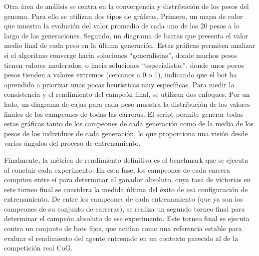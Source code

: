 Otra área de análisis se centra en la convergencia y distribución de los pesos del genoma. Para ello se utilizan dos tipos de gráficas. Primero, un mapa de calor que muestra la evolución del valor promedio de cada uno de los 20 pesos a lo largo de las generaciones. Segundo, un diagrama de barras que presenta el valor medio final de cada peso en la última generación. Estas gráficas permiten analizar si el algoritmo converge hacia soluciones ``generalistas'', donde muchos pesos tienen valores moderados, o hacia soluciones ``especialistas'', donde unos pocos pesos tienden a valores extremos (cercanos a 0 o 1), indicando que el bot ha aprendido a priorizar unas pocas heurísticas muy específicas. Para medir la consistencia y el rendimiento del campeón final, se utilizan dos enfoques. Por un lado, un diagrama de cajas para cada peso muestra la distribución de los valores finales de los campeones de todas las carreras. El script permite generar todas estas gráficas tanto de los campeones de cada generación como de la media de los pesos de los individuos de cada generación, lo que proporciona una visión desde varios ángulos del proceso de entrenamiento.

Finalmente, la métrica de rendimiento definitiva es el benchmark que se ejecuta al concluir cada experimento. En esta fase, los campeones de cada carrera compiten entre sí para determinar al ganador absoluto, cuya tasa de victorias en este torneo final se considera la medida última del éxito de esa configuración de entrenamiento. De entre los campeones de cada entrenamiento (que ya son los campeones de su conjunto de carreras), se realiza un segundo torneo final para determinar el campeón absoluto de ese experimento. Este torneo final se ejecuta contra un conjunto de bots fijos, que actúan como una referencia estable para evaluar el rendimiento del agente entrenado en un contexto parecido al de la competición real CoG.